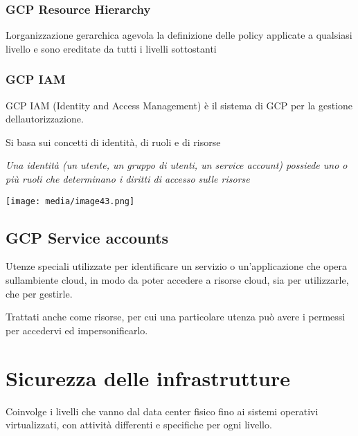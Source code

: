 \subsubsection{GCP Resource Hierarchy}\label{gcp-resource-hierarchy}

L\textquotesingle organizzazione gerarchica agevola la definizione delle
policy applicate a qualsiasi livello e sono ereditate da tutti i livelli
sottostanti

\subsubsection{GCP IAM}\label{gcp-iam}

GCP IAM (Identity and Access Management) è il sistema di GCP per la
gestione dell\textquotesingle autorizzazione.

Si basa sui concetti di identità, di ruoli e di risorse

\emph{Una identità (un utente, un gruppo di utenti, un service account)
possiede uno o più ruoli che determinano i diritti di accesso sulle
risorse}

\texttt{[image: media/image43.png]}

\subsection{GCP Service accounts}\label{gcp-service-accounts}

Utenze speciali utilizzate per identificare un servizio o
un'applicazione che opera sull\textquotesingle ambiente cloud, in modo
da poter accedere a risorse cloud, sia per utilizzarle, che per
gestirle.

Trattati anche come risorse, per cui una particolare utenza può avere i
permessi per accedervi ed impersonificarlo.

\section{Sicurezza delle
infrastrutture}\label{sicurezza-delle-infrastrutture}

Coinvolge i livelli che vanno dal data center fisico fino ai sistemi
operativi virtualizzati, con attività differenti e specifiche per ogni
livello.

